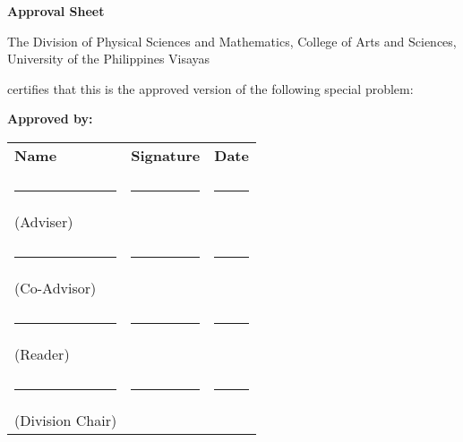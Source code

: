 \begin{center}
\textbf{Approval Sheet}
	
The Division of Physical Sciences and Mathematics, College of Arts and Sciences, University of the Philippines Visayas 

certifies that this is the approved version of the following special problem:

\end{center}

{\small\textbf{Approved by:}}

\newcommand{\signaturerule}{\rule{10em}{.4pt}}
	\begin{tabular}{lll}
		\bfseries Name  & \bfseries Signature & \bfseries Date\\ \\
		\signaturerule &\signaturerule  & \signaturerule\\ 
		(Adviser)\\ \\
		\signaturerule &\signaturerule &\signaturerule\\
		(Co-Advisor)\\ \\
		\signaturerule &\signaturerule &\signaturerule\\
		(Reader)\\ \\
		\signaturerule &\signaturerule &\signaturerule\\
		(Division Chair)

	\end{tabular}
